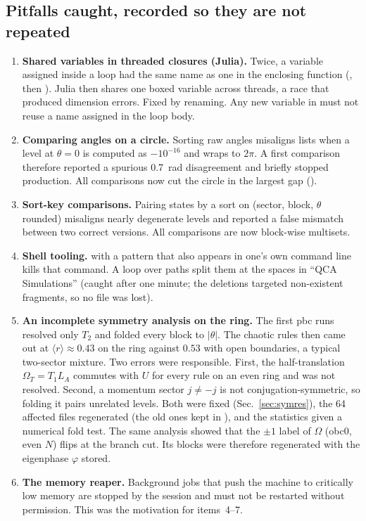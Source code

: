 \subsection{Pitfalls caught, recorded so they are not repeated}
\begin{enumerate}
\item \textbf{Shared variables in threaded closures (Julia).} Twice, a variable assigned inside a
   loop had the same name as one in the enclosing function (, then ). Julia then
  shares one boxed variable across threads, a race that produced dimension errors. Fixed by renaming. Any new variable in
   must not reuse a name assigned in the loop body.
\item \textbf{Comparing angles on a circle.} Sorting raw angles misaligns lists when a level at $\theta=0$ is computed as
  $-10^{-16}$ and wraps to $2\pi$. A first comparison therefore reported a spurious 0.7~rad disagreement and briefly
  stopped production. All comparisons now cut the circle in the largest gap ().
\item \textbf{Sort-key comparisons.} Pairing states by a sort on (sector, block, $\theta$ rounded) misaligns nearly
  degenerate levels and reported a false mismatch between two correct versions. All comparisons are now block-wise
  multisets.
\item \textbf{Shell tooling.}  with a pattern that also appears in one's own command line kills that
  command. A  loop over paths split them at the spaces in ``QCA Simulations'' (caught after one minute; the
  deletions targeted non-existent fragments, so no file was lost).
\item \textbf{An incomplete symmetry analysis on the ring.} The first pbc runs resolved only $T_2$ and folded every
  block to $|\theta|$. The chaotic rules then came out at $\langle r\rangle\approx0.43$ on the ring against $0.53$ with
  open boundaries, a typical two-sector mixture. Two errors were responsible. First, the half-translation
  $\Omega_T=T_1L_A$ commutes with $U$ for every rule on an even ring and was not resolved. Second, a momentum sector
  $j\ne-j$ is not conjugation-symmetric, so folding it pairs unrelated levels. Both were fixed (Sec.~\ref{sec:symres}),
  the 64 affected files regenerated (the old ones kept in ), and the
  statistics given a numerical fold test. The same analysis showed that the $\pm1$ label of $\Omega$ (obc0, even $N$)
  flips at the branch cut. Its blocks were therefore regenerated with the eigenphase $\varphi$ stored.
\item \textbf{The memory reaper.} Background jobs that push the machine to critically low memory are stopped by the
  session and must not be restarted without permission. This was the motivation for items~4--7.
\end{enumerate}
